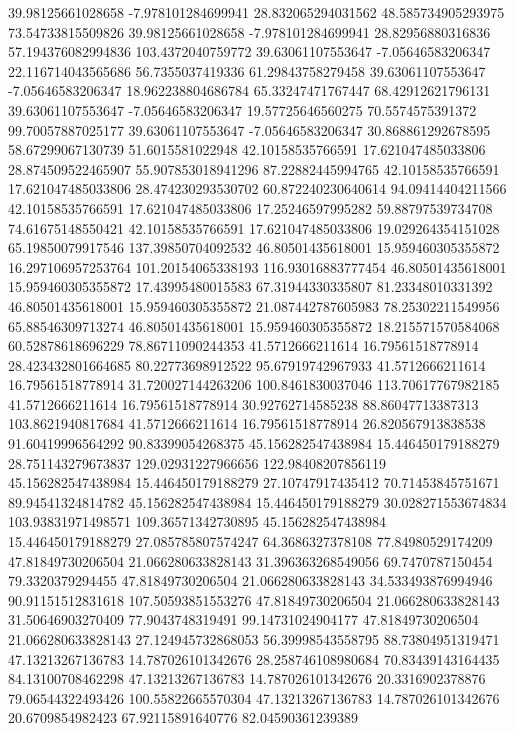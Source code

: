 39.98125661028658 -7.978101284699941 28.832065294031562 48.585734905293975 73.54733815509826
39.98125661028658 -7.978101284699941 28.82956880316836 57.194376082994836 103.4372040759772
39.63061107553647 -7.05646583206347 22.116714043565686 56.7355037419336 61.29843758279458
39.63061107553647 -7.05646583206347 18.962238804686784 65.33247471767447 68.42912621796131
39.63061107553647 -7.05646583206347 19.57725646560275 70.5574575391372 99.70057887025177
39.63061107553647 -7.05646583206347 30.868861292678595 58.67299067130739 51.6015581022948
42.10158535766591 17.621047485033806 28.874509522465907 55.907853018941296 87.22882445994765
42.10158535766591 17.621047485033806 28.474230293530702 60.872240230640614 94.09414404211566
42.10158535766591 17.621047485033806 17.25246597995282 59.88797539734708 74.61675148550421
42.10158535766591 17.621047485033806 19.029264354151028 65.19850079917546 137.39850704092532
46.80501435618001 15.959460305355872 16.297106957253764 101.20154065338193 116.93016883777454
46.80501435618001 15.959460305355872 17.43995480015583 67.31944330335807 81.23348010331392
46.80501435618001 15.959460305355872 21.087442787605983 78.25302211549956 65.88546309713274
46.80501435618001 15.959460305355872 18.215571570584068 60.52878618696229 78.86711090244353
41.5712666211614 16.79561518778914 28.423432801664685 80.22773698912522 95.67919742967933
41.5712666211614 16.79561518778914 31.720027144263206 100.8461830037046 113.70617767982185
41.5712666211614 16.79561518778914 30.92762714585238 88.86047713387313 103.8621940817684
41.5712666211614 16.79561518778914 26.820567913838538 91.60419996564292 90.83399054268375
45.156282547438984 15.446450179188279 28.751143279673837 129.02931227966656 122.98408207856119
45.156282547438984 15.446450179188279 27.10747917435412 70.71453845751671 89.94541324814782
45.156282547438984 15.446450179188279 30.028271553674834 103.93831971498571 109.36571342730895
45.156282547438984 15.446450179188279 27.085785807574247 64.3686327378108 77.84980529174209
47.81849730206504 21.066280633828143 31.396363268549056 69.7470787150454 79.3320379294455
47.81849730206504 21.066280633828143 34.533493876994946 90.91151512831618 107.50593851553276
47.81849730206504 21.066280633828143 31.50646903270409 77.9043748319491 99.14731024904177
47.81849730206504 21.066280633828143 27.124945732868053 56.39998543558795 88.73804951319471
47.13213267136783 14.787026101342676 28.258746108980684 70.83439143164435 84.13100708462298
47.13213267136783 14.787026101342676 20.3316902378876 79.06544322493426 100.55822665570304
47.13213267136783 14.787026101342676 20.6709854982423 67.92115891640776 82.04590361239389
